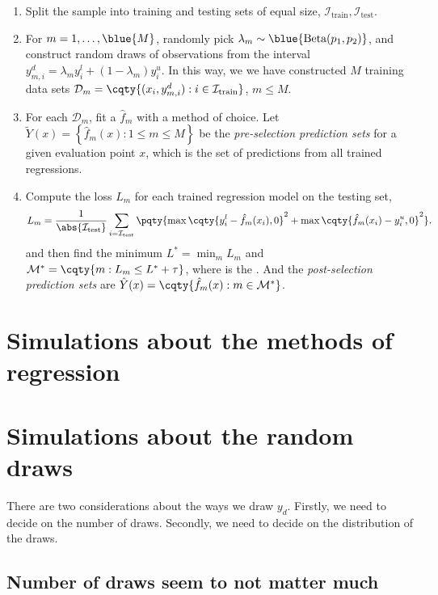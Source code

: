 \documentclass[11pt]{article}
\begin{document}
    \begin{enumerate}
        \item Split the sample into training and testing sets of equal size, \(\mathcal{I}_{\text{train}}, \mathcal{I}_{\text{test}}\). 
        \item For \(m = 1,\dots, \blue{M}\), randomly pick \(\lambda_{m} \sim \blue{\text{Beta}(p_{1}, p_{2})}\), and construct random draws of observations from the interval \(y_{m,i}^{d} = \lambda_{m}y^{l}_{i} + (1 - \lambda_{m}) y^{u}_{i}\). In this way, we we have constructed \(M\) training data sets \(\mathcal{D}_{m} = \cqty{(x_{i}, y_{m,i}^{d}): i \in \mathcal{I}_{\text{train}}}\), \(m\leq M\). 
        \item For each \(\mathcal{D}_{m}\), fit a  \(\hat{f}_{m}\) with a method of choice. Let \(\tilde{Y}(x) = \left\{\hat{f}_{m}(x): 1\leq m\leq M\right\}\) be the \textit{pre-selection prediction sets} for a given evaluation point \(x\), which is the set of predictions from all trained regressions.
        \item Compute the loss \(L_{m}\) for each trained regression model on the testing set,
        \begin{equation*}
            L_{m} = \frac{1}{\abs{\mathcal{I}_{\text{test}}}}\sum_{i = \mathcal{I}_{\text{test}}} \pqty{\max\cqty{y_{i}^{l} - \hat{f}_{m}(x_{i}), 0}^{2} + \max\cqty{\hat{f}_{m}(x_{i}) - y_{i}^{u}, 0}^{2}}.
        \end{equation*}
        and then find the  minimum \(L^{*} = \min_{m} L_{m}\) and \(\mathcal{M}^{*} = \cqty{m: L_{m} \leq L^{*} + \tau}\), where \blue{\(\tau\)} is the . And the \textit{post-selection prediction sets} are \(\hat{Y}(x) = \cqty{\hat{f}_{m}(x): m\in \mathcal{M}^{*}}\).
    \end{enumerate}

    \section{Simulations about the methods of regression}
    


    \section{Simulations about the random draws }

    There are two considerations about the ways we draw \(y_{d}\). Firstly, we need to decide on the number of draws. Secondly, we need to decide on the distribution of the draws. 

    \subsection{Number of draws seem to not matter much}


\end{document}
